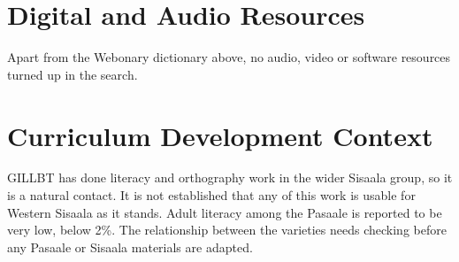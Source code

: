\documentclass[12pt]{article}
\begin{document}
\section{Digital and Audio Resources}
Apart from the Webonary dictionary above, no audio, video or software resources turned up in the search.

\section{Curriculum Development Context}
GILLBT has done literacy and orthography work in the wider Sisaala group, so it is a natural contact. It is not established that any of this work is usable for Western Sisaala as it stands. Adult literacy among the Pasaale is reported to be very low, below 2\%. The relationship between the varieties needs checking before any Pasaale or Sisaala materials are adapted.
\end{document}
